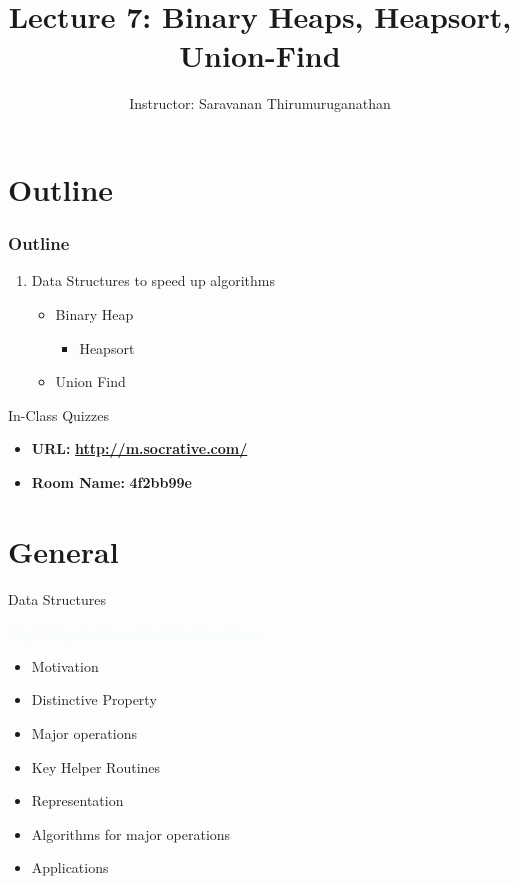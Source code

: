 \documentclass{beamer}
\title[Saravanan Thirumuruganathan] 
{Lecture 7: Binary Heaps, Heapsort, Union-Find}
\author[CSE 5311] 
{Instructor: Saravanan Thirumuruganathan}
\date[]
\newcommand{\tblue}[1]{{\Large {\textcolor{azure}{#1}}}}
\begin{document}
\begin{frame}
  \titlepage
\end{frame}


\section{Outline}

\begin{frame}
\frametitle {Outline}
\begin{enumerate}
\item Data Structures to speed up algorithms 
\begin{itemize}
    \item Binary Heap
    \begin{itemize}
        \item Heapsort
    \end{itemize}
    \item Union Find
\end{itemize}
\end{enumerate}
\end{frame}

\begin{frame}{In-Class Quizzes}
\begin{itemize}
\item {\Large {\bf URL:}} {\LARGE \bf \url{http://m.socrative.com/}} 
\item {\Large {\bf Room Name:} {\LARGE \bf 4f2bb99e}}
\end{itemize}
\end{frame}

\section{General}

\begin{frame}{Data Structures}

\tblue{Key Things to Know for Data Structures}
\begin{itemize}
    \item Motivation
    \item Distinctive Property
    \item Major operations
    \item Key Helper Routines
    \item Representation
    \item Algorithms for major operations
    \item Applications
\end{itemize}
\end{frame}
\end{document}
